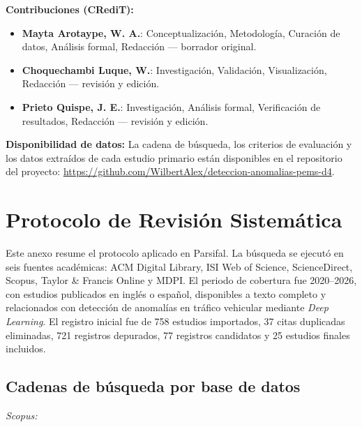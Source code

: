 \documentclass[12pt, a4paper]{article}
\begin{document}
\textbf{Contribuciones (CRediT):}
\begin{itemize}
  \item \textbf{Mayta Arotaype, W. A.}: Conceptualizaci\'{o}n, Metodolog\'{i}a, Curaci\'{o}n de datos, An\'{a}lisis formal, Redacci\'{o}n --- borrador original.
  \item \textbf{Choquechambi Luque, W.}: Investigaci\'{o}n, Validaci\'{o}n, Visualizaci\'{o}n, Redacci\'{o}n --- revisi\'{o}n y edici\'{o}n.
  \item \textbf{Prieto Quispe, J. E.}: Investigaci\'{o}n, An\'{a}lisis formal, Verificaci\'{o}n de resultados, Redacci\'{o}n --- revisi\'{o}n y edici\'{o}n.
\end{itemize}

\textbf{Disponibilidad de datos:} La cadena de b\'{u}squeda, los criterios de evaluaci\'{o}n y los datos extra\'{i}dos de cada estudio primario est\'{a}n disponibles en el repositorio del proyecto: \url{https://github.com/WilbertAlex/deteccion-anomalias-pems-d4}.




\appendix

\section{Protocolo de Revisi\'{o}n Sistem\'{a}tica}

Este anexo resume el protocolo aplicado en Parsifal. La b\'{u}squeda se ejecut\'{o} en seis fuentes acad\'{e}micas: ACM Digital Library, ISI Web of Science, ScienceDirect, Scopus, Taylor \& Francis Online y MDPI. El periodo de cobertura fue 2020--2026, con estudios publicados en ingl\'{e}s o espa\~{n}ol, disponibles a texto completo y relacionados con detecci\'{o}n de anomal\'{i}as en tr\'{a}fico vehicular mediante \textit{Deep Learning}. El registro inicial fue de 758 estudios importados, 37 citas duplicadas eliminadas, 721 registros depurados, 77 registros candidatos y 25 estudios finales incluidos.

\subsection*{Cadenas de b\'{u}squeda por base de datos}

\noindent\textit{Scopus:}
\begin{center}
\end{center}
\end{document}
